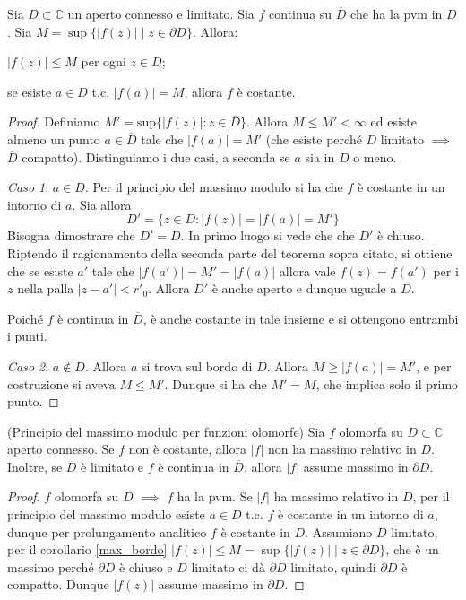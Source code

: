 \begin{cor} \label{max_bordo}
  Sia $D \subset \mathbb{C}$ un aperto connesso e limitato. Sia $f$ continua su $\overline{D}$ che ha la pvm in $D$. Sia $M=\sup\{|f(z)| \mid z \in \partial D\}$. Allora:
  \begin{nlist}
    \item $|f(z)| \le M$ per ogni $z \in D$;
    \item se esiste $a \in D$ t.c. $|f(a)|=M$, allora $f$ è costante.
  \end{nlist}
\end{cor}

\begin{proof}
    Definiamo $M'=\text{sup}\{|f(z)|:z\in\overline{D}\}$. Allora $M\leq
    M'<\infty$ ed esiste almeno un punto $a\in\overline{D}$ tale che
    $|f(a)|=M'$ (che esiste perché $D$ limitato $\implies$ $\overline{D}$ compatto). Distinguiamo i due casi, a seconda se $a$ sia in $D$ o meno.

    \emph{Caso 1}: $a\in D$. Per il principio del massimo modulo si ha che $f$
    \`e costante in un intorno di $a$. Sia allora
    \[
        D' = \{z\in D: |f(z)|=|f(a)|=M'\}
    \]
    Bisogna dimostrare che $D'=D$. In primo luogo si vede che che $D'$ \`e
    chiuso.
    Riptendo il ragionamento della seconda parte del teorema sopra citato, si
    ottiene che se esiste $a'$ tale che $|f(a')|=M'=|f(a)|$ allora vale
    $f(z)=f(a')$ per i $z$ nella palla $|z-a'|<r'_0$. Allora $D'$ \`e anche aperto
    e dunque uguale a $D$.

    Poich\'e $f$ \`e continua in $\overline{D}$, \`e anche costante in tale
    insieme e si ottengono entrambi i punti.

    \emph{Caso 2}: $a\notin D$. Allora $a$ si trova sul bordo di $D$. Allora
    $M\geq |f(a)| = M'$, e per costruzione si aveva $M\leq M'$. Dunque si ha che
    $M'=M$, che implica solo il primo punto.
\end{proof}

\begin{cor}
  (Principio del massimo modulo per funzioni olomorfe) Sia $f$ olomorfa su $D \subset \mathbb{C}$ aperto connesso. Se $f$ non è costante, allora $|f|$ non ha massimo relativo in $D$. Inoltre, se $D$ è limitato e $f$ è continua in $\overline{D}$, allora $|f|$ assume massimo in $\partial D$.
\end{cor}

\begin{proof}
  $f$ olomorfa su $D$ $\implies$ $f$ ha la pvm. Se $|f|$ ha massimo relativo in $D$, per il principio del massimo modulo esiste $a \in D$ t.c. $f$ è costante in un intorno di $a$, dunque per prolungamento analitico $f$ è costante in $D$.
  Assumiano $D$ limitato, per il corollario \ref{max_bordo} $|f(z)| \le M=\sup\{|f(z)| \mid z \in \partial D\}$, che è un massimo perché $\partial D$ è chiuso e $D$ limitato ci dà $\partial D$ limitato, quindi $\partial D$ è compatto. Dunque $|f(z)|$ assume massimo in $\partial D$.
\end{proof}

